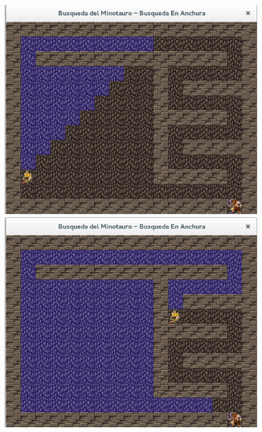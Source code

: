\documentclass[letter, titlepage, 10pt]{article}
\begin{document}
\begin{appendices}
  
    \begin{figure}[H]
  \centering
    \begin{minipage}{.5\textwidth}
        \centering
        \includegraphics[width=\linewidth]{images/bea_01_m2}
    \end{minipage}%
    \begin{minipage}{.5\textwidth}
        \centering
        \includegraphics[width=\linewidth]{images/bea_02_m2}
    \end{minipage}
\end{figure}


\end{appendices}
\end{document}

